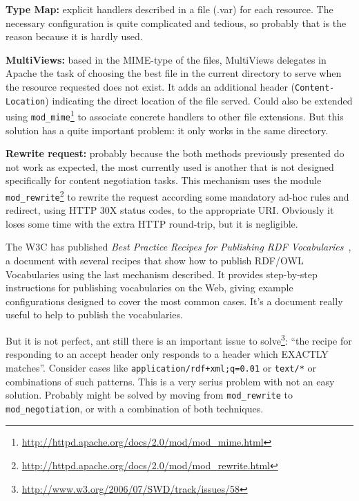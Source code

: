 \begin{description}

  \item \textbf{Type Map:} explicit handlers described in a file (.var) for each 
        resource. The necessary configuration is quite complicated and tedious, 
        so probably that is the reason because it is hardly used.

  \item \textbf{MultiViews:} based in the MIME-type of the files, MultiViews 
        delegates in Apache the task of choosing the best file in the current 
        directory to serve when the resource requested does not exist. It adds 
        an additional header (\texttt{Content-Location}) indicating the direct 
        location of the file served. Could also be extended using 
        \texttt{mod\_mime}\footnote{\url{http://httpd.apache.org/docs/2.0/mod/mod_mime.html}}
        to associate concrete handlers to other file extensions. But this solution
        has a quite important problem: it only works in the same directory.

  \item \textbf{Rewrite request:} probably because the both methods previously 
        presented do not work as expected, the most currently used is another 
        that is not designed specifically for content negotiation tasks. This
        mechanism uses the module 
        \texttt{mod\_rewrite}\footnote{\url{http://httpd.apache.org/docs/2.0/mod/mod_rewrite.html}}
        to rewrite the request according some mandatory ad-hoc rules and redirect,
        using HTTP 30X status codes, to the appropriate URI. Obviously it loses 
        some time with the extra HTTP round-trip, but it is negligible.

 \end{description}

The W3C has published \textit{Best Practice Recipes for Publishing RDF Vocabularies}~\cite{Recipes},
a document with several recipes that show how to publish RDF/OWL Vocabularies using
the last mechanism described. It provides step-by-step instructions for publishing 
vocabularies on the Web, giving example configurations designed to cover the most 
common cases. It's a document really useful to help to publish the vocabularies.

But it is not perfect, ant still there is an important issue to 
solve\footnote{\url{http://www.w3.org/2006/07/SWD/track/issues/58}}: 
``the recipe for responding to an accept header only responds to a header which
EXACTLY matches''. Consider cases like \texttt{application/rdf+xml;q=0.01} or 
\texttt{text/*} or combinations of such patterns. This is a very serius problem
with not an easy solution. Probably might be solved by moving from \texttt{mod\_rewrite}
to \texttt{mod\_negotiation}, or with a combination of both techniques.

